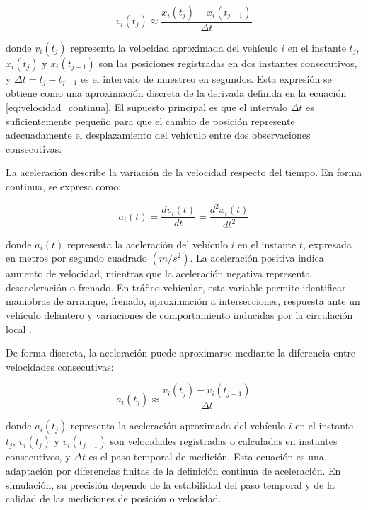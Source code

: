 \begin{equation}
v_i(t_j) \approx \frac{x_i(t_j)-x_i(t_{j-1})}{\Delta t}
\label{eq:velocidad_discreta}
\end{equation}

donde \(v_i(t_j)\) representa la velocidad aproximada del vehículo \(i\) en el instante \(t_j\), \(x_i(t_j)\) y \(x_i(t_{j-1})\) son las posiciones registradas en dos instantes consecutivos, y \(\Delta t=t_j-t_{j-1}\) es el intervalo de muestreo en segundos. Esta expresión se obtiene como una aproximación discreta de la derivada definida en la ecuación \eqref{eq:velocidad_continua}. El supuesto principal es que el intervalo \(\Delta t\) es suficientemente pequeño para que el cambio de posición represente adecuadamente el desplazamiento del vehículo entre dos observaciones consecutivas.

La aceleración describe la variación de la velocidad respecto del tiempo. En forma continua, se expresa como:

\begin{equation}
a_i(t)=\frac{dv_i(t)}{dt}=\frac{d^2x_i(t)}{dt^2}
\label{eq:aceleracion_continua}
\end{equation}

donde \(a_i(t)\) representa la aceleración del vehículo \(i\) en el instante \(t\), expresada en metros por segundo cuadrado \((m/s^2)\). La aceleración positiva indica aumento de velocidad, mientras que la aceleración negativa representa desaceleración o frenado. En tráfico vehicular, esta variable permite identificar maniobras de arranque, frenado, aproximación a intersecciones, respuesta ante un vehículo delantero y variaciones de comportamiento inducidas por la circulación local \cite{immers2005trafficflow}.

De forma discreta, la aceleración puede aproximarse mediante la diferencia entre velocidades consecutivas:

\begin{equation}
a_i(t_j) \approx \frac{v_i(t_j)-v_i(t_{j-1})}{\Delta t}
\label{eq:aceleracion_discreta}
\end{equation}

donde \(a_i(t_j)\) representa la aceleración aproximada del vehículo \(i\) en el instante \(t_j\), \(v_i(t_j)\) y \(v_i(t_{j-1})\) son velocidades registradas o calculadas en instantes consecutivos, y \(\Delta t\) es el paso temporal de medición. Esta ecuación es una adaptación por diferencias finitas de la definición continua de aceleración. En simulación, su precisión depende de la estabilidad del paso temporal y de la calidad de las mediciones de posición o velocidad.

